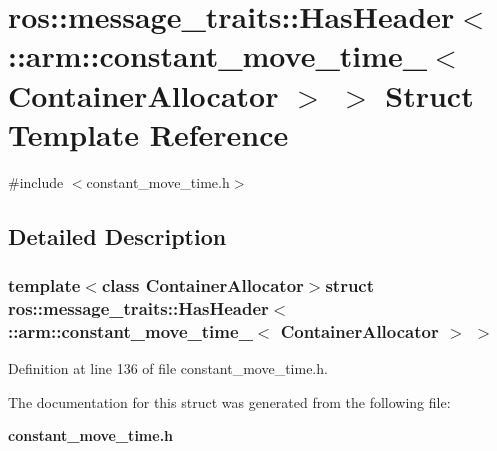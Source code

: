 \section{ros\-:\-:message\-\_\-traits\-:\-:\-Has\-Header$<$ \-:\-:arm\-:\-:constant\-\_\-move\-\_\-time\-\_\-$<$ \-Container\-Allocator $>$ $>$ \-Struct \-Template \-Reference}
\label{structros_1_1message__traits_1_1HasHeader_3_01_1_1arm_1_1constant__move__time___3_01ContainerAllocator_01_4_01_4}


{\ttfamily \#include $<$constant\-\_\-move\-\_\-time.\-h$>$}



\subsection{\-Detailed \-Description}
\subsubsection*{template$<$class Container\-Allocator$>$struct ros\-::message\-\_\-traits\-::\-Has\-Header$<$ \-::arm\-::constant\-\_\-move\-\_\-time\-\_\-$<$ Container\-Allocator $>$ $>$}



\-Definition at line 136 of file constant\-\_\-move\-\_\-time.\-h.



\-The documentation for this struct was generated from the following file\-:\begin{DoxyCompactItemize}
\item 
{\bf constant\-\_\-move\-\_\-time.\-h}\end{DoxyCompactItemize}
